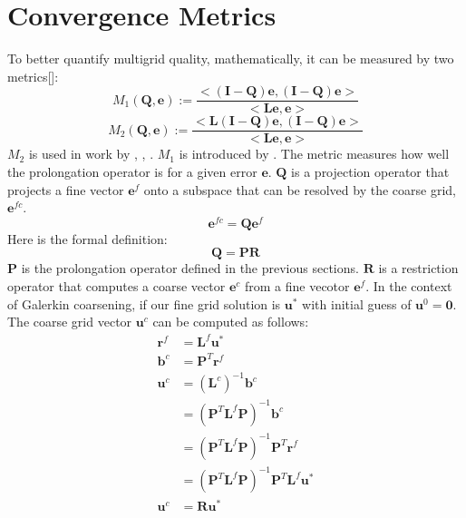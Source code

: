 \section{Convergence Metrics} 
\label{sec:Convergence_Metric}
  To better quantify multigrid quality, mathematically, it can be measured by two metrics[\cite{brezina2001algebraic}]: 
\begin{equation}
\label{equ:M1}
M_1(\mathbf{Q},\mathbf{e}) := \frac{<(\mathbf{I}-\mathbf{Q})\mathbf{e}, (\mathbf{I}-\mathbf{Q})\mathbf{e}>}{<\mathbf{L}\mathbf{e},\mathbf{e}>}
\end{equation}
\begin{equation}
\label{equ:M2}
M_2(\mathbf{Q},\mathbf{e}) := \frac{<\mathbf{L}(\mathbf{I}-\mathbf{Q})\mathbf{e}, (\mathbf{I}-\mathbf{Q})\mathbf{e}>}{<\mathbf{L}\mathbf{e},\mathbf{e}>}
\end{equation}
$M_2$ is used in work by \cite{mccormick1984multigrid}, \cite{mccormick1982multigrid}, \cite{mccormick1985multigrid}. $M_1$ is introduced by \cite{brandt1986algebraic}. The metric measures how well the prolongation operator is for a given error $\mathbf{e}$. $\mathbf{Q}$ is a projection operator that projects a fine vector $\mathbf{e}^f$ onto a subspace that can be resolved by the coarse grid, $\mathbf{e}^{fc}$. 
$$
\mathbf{e}^{fc} = \mathbf{Q}\mathbf{e}^f
$$
Here is the formal definition: 
\begin{equation}
\mathbf{Q} = \mathbf{P}\mathbf{R}
\end{equation}
$\mathbf{P}$ is the prolongation operator defined in the previous sections. $\mathbf{R}$ is a restriction operator that computes a coarse vector $\mathbf{e}^c$ from a fine vecotor $\mathbf{e}^f$. In the context of Galerkin coarsening, if our fine grid solution is $\mathbf{u}^*$ with initial guess of $\mathbf{u}^0 = \mathbf{0}$. The coarse grid vector $\mathbf{u}^c$ can be computed as follows:
\begin{align*}
\mathbf{r}^f &= \mathbf{L}^f\mathbf{u}^* \\
\mathbf{b}^c &= \mathbf{P}^T\mathbf{r}^f \\
\mathbf{u}^c &= (\mathbf{L}^c)^{-1}\mathbf{b}^c \\
&=  (\mathbf{P}^T\mathbf{L}^f\mathbf{P})^{-1}\mathbf{b}^c \\
&=  (\mathbf{P}^T\mathbf{L}^f\mathbf{P})^{-1}\mathbf{P}^T\mathbf{r}^f \\
&= (\mathbf{P}^T\mathbf{L}^f\mathbf{P})^{-1}\mathbf{P}^T\mathbf{L}^f\mathbf{u}^* \\
\mathbf{u}^c &= \mathbf{R} \mathbf{u}^*
\end{align*}

